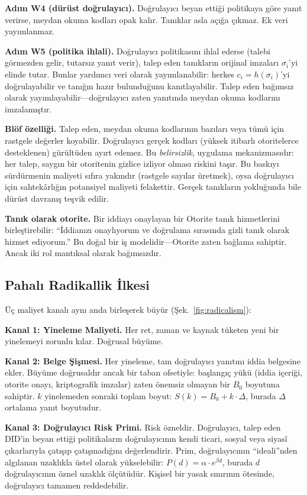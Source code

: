 \documentclass[11pt,a4paper,twocolumn]{article}
\begin{document}
\textbf{Adım W4 (dürüst doğrulayıcı).} Doğrulayıcı beyan ettiği politikaya göre yanıt verirse, meydan okuma kodları opak kalır. Tanıklar asla açığa çıkmaz. Ek veri yayımlanmaz.

\textbf{Adım W5 (politika ihlali).} Doğrulayıcı politikasını ihlal ederse (talebi görmezden gelir, tutarsız yanıt verir), talep eden tanıkların orijinal imzaları $\sigma_i$'yi elinde tutar. Bunlar yardımcı veri olarak yayımlanabilir: herkes $c_i = h(\sigma_i)$'yi doğrulayabilir ve tanığın hazır bulunduğunu kanıtlayabilir. Talep eden bağımsız olarak yayımlayabilir---doğrulayıcı zaten yanıtında meydan okuma kodlarını imzalamıştır.

\textbf{Blöf özelliği.} Talep eden, meydan okuma kodlarının bazıları veya tümü için rastgele değerler koyabilir. Doğrulayıcı gerçek kodları (yüksek itibarlı otoritelerce desteklenen) gürültüden ayırt edemez. Bu \emph{belirsizlik}, uygulama mekanizmasıdır: her talep, saygın bir otoritenin gizlice izliyor olması riskini taşır. Bu baskıyı sürdürmenin maliyeti sıfıra yakındır (rastgele sayılar üretmek), oysa doğrulayıcı için sahtekârlığın potansiyel maliyeti felakettir. Gerçek tanıkların yokluğunda bile dürüst davranış teşvik edilir.

\textbf{Tanık olarak otorite.} Bir iddiayı onaylayan bir Otorite tanık hizmetlerini birleştirebilir: ``İddianızı onaylıyorum ve doğrulama sırasında gizli tanık olarak hizmet ediyorum.'' Bu doğal bir iş modelidir---Otorite zaten bağlama sahiptir. Ancak iki rol mantıksal olarak bağımsızdır.

\subsection{Pahalı Radikallik İlkesi}

Üç maliyet kanalı aynı anda birleşerek büyür (Şek.~\ref{fig:radicalism}):

\textbf{Kanal 1: Yineleme Maliyeti.} Her ret, zaman ve kaynak tüketen yeni bir yinelemeyi zorunlu kılar. Doğrusal büyüme.

\textbf{Kanal 2: Belge Şişmesi.} Her yineleme, tam doğrulayıcı yanıtını iddia belgesine ekler. Büyüme doğrusaldır ancak bir taban ofsetiyle: başlangıç yükü (iddia içeriği, otorite onayı, kriptografik imzalar) zaten önemsiz olmayan bir $B_0$ boyutuna sahiptir. $k$ yinelemeden sonraki toplam boyut: $S(k) = B_0 + k \cdot \Delta$, burada $\Delta$ ortalama yanıt boyutudur.

\textbf{Kanal 3: Doğrulayıcı Risk Primi.} Risk özneldir. Doğrulayıcı, talep eden DID'in beyan ettiği politikaların doğrulayıcının kendi ticari, sosyal veya siyasî çıkarlarıyla çatışıp çatışmadığını değerlendirir. Prim, doğrulayıcının ``ideali''nden algılanan uzaklıkla üstel olarak yükselebilir: $P(d) = \alpha \cdot e^{\beta d}$, burada $d$ doğrulayıcının öznel uzaklık ölçütüdür. Kişisel bir yasak sınırının ötesinde, doğrulayıcı tamamen reddedebilir.
\end{document}
